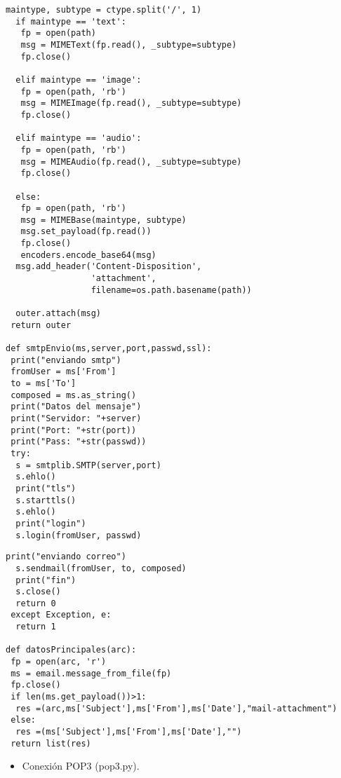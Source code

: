 \begin{lstlisting}[frame=single]
  maintype, subtype = ctype.split('/', 1)
  if maintype == 'text':
   fp = open(path)
   msg = MIMEText(fp.read(), _subtype=subtype)
   fp.close()
   
  elif maintype == 'image':
   fp = open(path, 'rb')
   msg = MIMEImage(fp.read(), _subtype=subtype)
   fp.close()
   
  elif maintype == 'audio':
   fp = open(path, 'rb')
   msg = MIMEAudio(fp.read(), _subtype=subtype)
   fp.close()
   
  else:
   fp = open(path, 'rb')
   msg = MIMEBase(maintype, subtype)
   msg.set_payload(fp.read())
   fp.close()
   encoders.encode_base64(msg)
  msg.add_header('Content-Disposition', 
                 'attachment', 
                 filename=os.path.basename(path))
                 
  outer.attach(msg)
 return outer

def smtpEnvio(ms,server,port,passwd,ssl):
 print("enviando smtp")
 fromUser = ms['From']
 to = ms['To']
 composed = ms.as_string()
 print("Datos del mensaje")
 print("Servidor: "+server)
 print("Port: "+str(port))
 print("Pass: "+str(passwd))
 try:
  s = smtplib.SMTP(server,port)
  s.ehlo()
  print("tls")
  s.starttls()
  s.ehlo()
  print("login")
  s.login(fromUser, passwd)
\end{lstlisting}
\begin{lstlisting}[frame=single]
  print("enviando correo")
  s.sendmail(fromUser, to, composed)
  print("fin")
  s.close()
  return 0
 except Exception, e:
  return 1

def datosPrincipales(arc):
 fp = open(arc, 'r')
 ms = email.message_from_file(fp)
 fp.close()
 if len(ms.get_payload())>1:
  res =(arc,ms['Subject'],ms['From'],ms['Date'],"mail-attachment")
 else:
  res =(ms['Subject'],ms['From'],ms['Date'],"")
 return list(res)

\end{lstlisting}
\begin{itemize}
\item Conexión POP3 (pop3.py).
\end{itemize}

